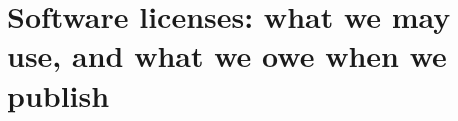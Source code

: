 \chapter{Software licenses: what we may use, and what we owe when we publish}
\label{ch:software-licenses-what-we-may-use-and}

